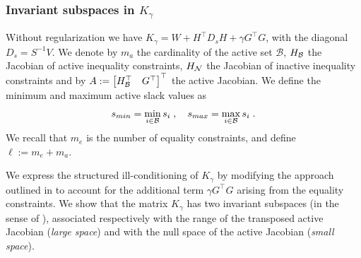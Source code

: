 \subsubsection{Invariant subspaces in $K_\gamma$}
Without regularization we have $K_\gamma = W + H^\top D_s H + \gamma G^\top G$, with
the diagonal $D_s = S^{-1} V$.
We denote by $m_a$ the cardinality of the active set $\mathcal{B}$,
$H_{\mathcal{B}}$ the Jacobian of active inequality constraints, $H_{\mathcal{N}}$ the
Jacobian of inactive inequality constraints and by
$A := \begin{bmatrix} H_{\mathcal{B}}^\top & G^\top \end{bmatrix}^\top$ the active Jacobian.
We define the minimum and maximum active slack values as
\begin{equation}
  s_{min} = \min_{i \in \mathcal{B}} s_i \; , \quad
  s_{max} = \max_{i \in \mathcal{B}} s_i \; .
\end{equation}
We recall that $m_e$ is the number of equality constraints,
and define $\ell := m_e + m_a$.

We express the structured ill-conditioning of $K_\gamma$ by
modifying the approach outlined in \cite[Theorem 3.2]{wright1998ill} to account for the additional
term $\gamma G^\top G$ arising from the equality constraints.
We show that the matrix $K_\gamma$ has two invariant subspaces
(in the sense of \cite[Chapter 5]{stewart1990matrix}),
associated respectively with the range of the transposed active Jacobian
(\emph{large space}) and with the null space of the active Jacobian (\emph{small space}).

